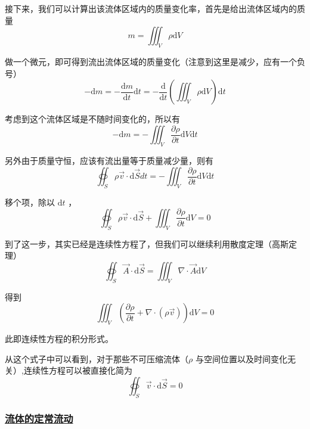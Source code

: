 接下来，我们可以计算出该流体区域内的质量变化率，首先是给出流体区域内的质量
\begin{equation*}
    m = \iiint_V \rho \mathrm{d}V
\end{equation*}

做一个微元，即可得到流出流体区域的质量变化（注意到这里是减少，应有一个负号）
\begin{equation*}
    -\mathrm{d} m = -\frac{\mathrm{d} m}{\mathrm{d} t} \mathrm{d} t = -\frac{\mathrm{d}}{\mathrm{d} t} \left(\iiint_V \rho \mathrm{d}V\right) \mathrm{d} t
\end{equation*}

考虑到这个流体区域是不随时间变化的，所以有 
\begin{equation*}
    -\mathrm{d} m = -\iiint_V \frac{\partial \rho}{\partial t} \mathrm{d}V \mathrm{d} t
\end{equation*}

另外由于质量守恒，应该有流出量等于质量减少量，则有 
\begin{equation*}
    \oiint_S \rho \vec{v} \cdot \mathrm{d} \vec{S} dt = -\iiint_V \frac{\partial \rho}{\partial t} \mathrm{d}V \mathrm{d} t
\end{equation*}


移个项，除以 $\mathrm{d} t$ ，
\begin{equation}
    \oiint_S \rho \vec{v} \cdot \mathrm{d} \vec{S} + \iiint_V \frac{\partial \rho}{\partial t} \mathrm{d}V = 0
\end{equation}

到了这一步，其实已经是连续性方程了，但我们可以继续利用散度定理（高斯定理）
\begin{equation}
    \oiint_S \vec{A} \cdot \mathrm{d} \vec{S} = \iiint_V \nabla \cdot \vec{A} \mathrm{d}V
\end{equation}

得到
\begin{equation}
    \iiint_V \left(\frac{\partial \rho}{\partial t} + \nabla \cdot (\rho \vec{v})\right) \mathrm{d}V = 0
\end{equation}

此即连续性方程的积分形式。

从这个式子中可以看到，对于那些不可压缩流体（$\rho$ 与空间位置以及时间变化无关）,连续性方程可以被直接化简为 
\begin{equation}
    \oiint_S \vec{v} \cdot \mathrm{d} \vec{S} = 0
\end{equation}


\subsubsection{\protect\hyperlink{:}{流体的定常流动}}


